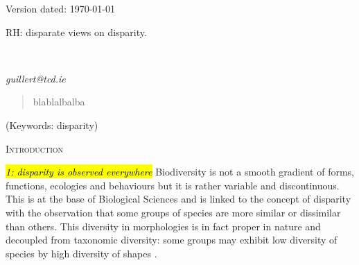 \documentclass[12pt,letterpaper]{article}
\renewcommand{\section}[1]{%
\bigskip
\begin{center}
\begin{Large}
\normalfont\scshape #1
\medskip
\end{Large}
\end{center}}
\begin{document}
\begin{flushright}
Version dated: \today
\end{flushright}
\bigskip
\noindent RH: disparate views on disparity.

\bigskip
\medskip
\begin{center}

\bigskip

\\
\end{center}
\medskip
{} \textit{guillert@tcd.ie}\\  
\vspace{1in}

\modulolinenumbers[1]
\linenumbers

%
%

\newpage
\begin{abstract}

\begin{enumerate}
    blablalbalba
\end{enumerate}

\end{abstract}

\noindent (Keywords: disparity)\\

\vspace{1.5in}

\newpage 

%
%

\section{Introduction}

\noindent \hl{\textit{1: disparity is observed everywhere}}
Biodiversity is not a smooth gradient of forms, functions, ecologies and behaviours but it is rather variable and discontinuous.
This is at the base of Biological Sciences and is linked to the concept of disparity with the observation that some groups of species are more similar or dissimilar than others.
This diversity in morphologies is in fact proper in nature and decoupled from taxonomic diversity: some groups may exhibit low diversity of species by high diversity of shapes \citep[or the other way around]{ruta2013,hopkinsdecoupling2013}.
\end{document}
